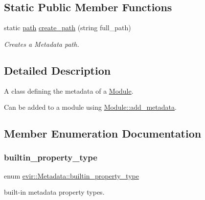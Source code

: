 \subsection*{Static Public Member Functions}
\begin{DoxyCompactItemize}
\item 
static \hyperlink{classevir_1_1Metadata_a0a3a8f0c937238fae5262283bac6286a}{path} \hyperlink{classevir_1_1Metadata_aa9244492c6a37b8b23191cc52c6b7e67}{create\+\_\+path} (string full\+\_\+path)
\begin{DoxyCompactList}\small\item\em Creates a Metadata path. \end{DoxyCompactList}\end{DoxyCompactItemize}


\subsection{Detailed Description}
A class defining the metadata of a \hyperlink{classevir_1_1Module}{Module}. 

Can be added to a module using \hyperlink{classevir_1_1Module_a8e8193a7ab86fb626058bd6135f8e2f8}{Module\+::add\+\_\+metadata}. 

\subsection{Member Enumeration Documentation}
\mbox{\label{classevir_1_1Metadata_a292423b7a2d93f70382d1da4929f55a0}} 
\subsubsection{\texorpdfstring{builtin\+\_\+property\+\_\+type}{builtin\_property\_type}}
{\footnotesize\ttfamily enum \hyperlink{classevir_1_1Metadata_a292423b7a2d93f70382d1da4929f55a0}{evir\+::\+Metadata\+::builtin\+\_\+property\+\_\+type}}



built-\/in metadata property types. 

